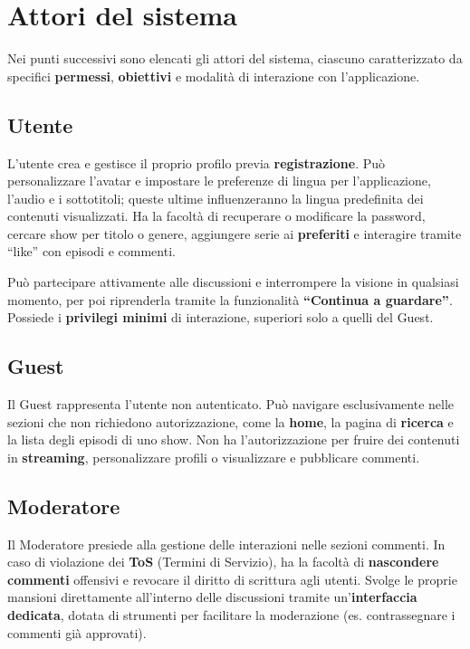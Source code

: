 \section{Attori del sistema}
Nei punti successivi sono elencati gli attori del sistema, ciascuno caratterizzato da specifici \textbf{permessi}, \textbf{obiettivi} e modalità di interazione con l'applicazione.

\subsection{Utente}
L'utente crea e gestisce il proprio profilo previa \textbf{registrazione}. Può personalizzare l'avatar e impostare le preferenze di lingua per l'applicazione, l'audio e i sottotitoli; queste ultime influenzeranno la lingua predefinita dei contenuti visualizzati. Ha la facoltà di recuperare o modificare la password, cercare show per titolo o genere, aggiungere serie ai \textbf{preferiti} e interagire tramite ``like'' con episodi e commenti. 

Può partecipare attivamente alle discussioni e interrompere la visione in qualsiasi momento, per poi riprenderla tramite la funzionalità \textbf{``Continua a guardare''}. Possiede i \textbf{privilegi minimi} di interazione, superiori solo a quelli del Guest.

\subsection{Guest}
Il Guest rappresenta l'utente non autenticato. Può navigare esclusivamente nelle sezioni che non richiedono autorizzazione, come la \textbf{home}, la pagina di \textbf{ricerca} e la lista degli episodi di uno show. Non ha l'autorizzazione per fruire dei contenuti in \textbf{streaming}, personalizzare profili o visualizzare e pubblicare commenti.

\subsection{Moderatore}
Il Moderatore presiede alla gestione delle interazioni nelle sezioni commenti. In caso di violazione dei \textbf{ToS} (Termini di Servizio), ha la facoltà di \textbf{nascondere commenti} offensivi e revocare il diritto di scrittura agli utenti. Svolge le proprie mansioni direttamente all'interno delle discussioni tramite un'\textbf{interfaccia dedicata}, dotata di strumenti per facilitare la moderazione (es. contrassegnare i commenti già approvati). 

